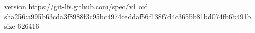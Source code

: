 version https://git-lfs.github.com/spec/v1
oid sha256:a995b63cda3f8988f3c95bc4974ceddaf56f138f7d4c3655b81bd074fb6b491b
size 626416
